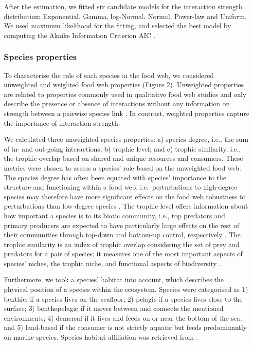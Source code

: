 \documentclass[gc, manuscript]{copernicus}
\begin{document}
After the estimation, we fitted six candidate models for the interaction
strength distribution: Exponential, Gamma, log-Normal, Normal, Power-law
and Uniform. We used maximum likelihood \citep{McCallum2008} for the
fitting, and selected the best model by computing the Akaike Information
Criterion AIC \citep{Burnham2002}.

\subsubsection{Species properties}

To characterise the role of each species in the food web, we considered
unweighted and weighted food web properties (Figure 2). Unweighted
properties are related to properties commonly used in qualitative food
web studies and only describe the presence or absence of interactions
without any information on strength between a pairwise species link
\citep{Martinez1991, Dunne2002, Borrelli2014}. In contrast, weighted
properties capture the importance of interaction strength.

We calculated three unweighted species properties: a) species degree,
i.e., the sum of in- and out-going interactions; b) trophic level; and
c) trophic similarity, i.e., the trophic overlap based on shared and
unique resources and consumers. These metrics were chosen to assess a
species' role based on the unweighted food web. The species degree has
often been equated with species' importance to the structure and
functioning within a food web, i.e.~perturbations to high-degree species
may therefore have more significant effects on the food web robustness
to perturbations than low-degree species
\citetext{\citealp{Dunne2002a}; \citealp[references
in][]{Cirtwill2018a}}. The trophic level offers information about how
important a species is to its biotic community, i.e., top predators and
primary producers are expected to have particularly large effects on the
rest of their communities through top-down and bottom-up control,
respectively \citep[references in][]{Cirtwill2018a}. The trophic
similarity is an index of trophic overlap considering the set of prey
and predators for a pair of species; it measures one of the most
important aspects of species' niches, the trophic niche, and functional
aspects of biodiversity \citep{Martinez1991, Williams2000}.

Furthermore, we took a species' habitat into account, which describes
the physical position of a species within the ecosystem. Species were
categorised as 1) benthic, if a species lives on the seafloor; 2)
pelagic if a species lives close to the surface; 3) benthopelagic if it
moves between and connects the mentioned environments; 4) demersal if it
lives and feeds on or near the bottom of the sea; and 5) land-based if
the consumer is not strictly aquatic but feeds predominantly on marine
species. Species habitat affiliation was retrieved from
\citet{Jacob2011}.
\end{document}
